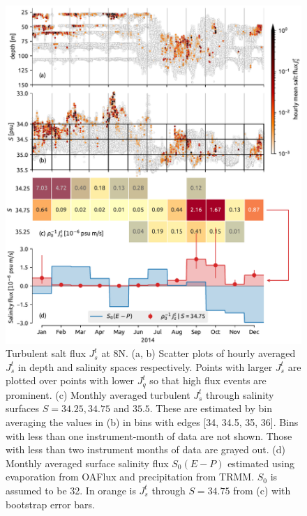 \documentclass[onecol]{ametsoc}
\begin{document}
\begin{figure}
\centering
\includegraphics[width=\textwidth]{figure10-8n.pdf}
\caption{\label{fig:8njs}
Turbulent salt flux \(J_s^t\) at 8N. (a, b) Scatter plots of hourly averaged \(J_s^t\) in depth and salinity spaces respectively. Points with larger \(J_s^t\) are plotted over points with lower \(J_q^t\) so that high flux events are prominent. (c) Monthly averaged turbulent \(J_s^t\) through salinity surfaces \(S=34.25, 34.75\) and \(35.5\). These are estimated by bin averaging the values in (b) in bins with edges [34, 34.5, 35, 36]. Bins with less than one instrument-month of data are not shown. Those with less than two instrument months of data are grayed out. (d) Monthly averaged surface salinity flux \(S_0 (E-P)\) estimated using evaporation from OAFlux and precipitation from TRMM. \(S_0\) is assumed to be 32. In orange is \(J_s^t\) through \(S=34.75\) from (c) with bootstrap error bars.}
\end{figure}
\end{document}
